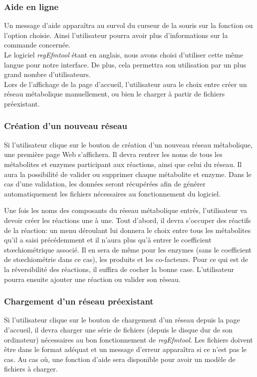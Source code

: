 \subsubsection{Aide en ligne}
Un message d'aide apparaîtra au survol du curseur de la souris sur la fonction ou l'option choisie. Ainsi l'utilisateur pourra avoir plus d'informations sur la commande concernée.\\

Le logiciel \textit{regEfmtool} étant en anglais, nous avons choisi d'utiliser cette même langue pour notre interface. De plus, cela permettra son utilisation par un plus grand nombre d'utilisateurs. \\
Lors de l'affichage de la page d'accueil, l'utilisateur aura le choix entre créer un réseau métabolique manuellement, ou bien le charger à partir de fichiers préexistant. 
			
\subsubsection{Création d'un nouveau réseau}

Si l'utilisateur clique sur le bouton de création d'un nouveau réseau métabolique, une première page Web s'affichera. Il devra rentrer les noms de tous les métabolites et enzymes participant aux réactions, ainsi que celui du réseau. Il aura la possibilité de valider ou supprimer chaque métabolite et enzyme. Dans le cas d'une validation, les données seront récupérées afin de générer automatiquement les fichiers nécessaires au fonctionnement du logiciel.

Une fois les noms des composants du réseau métabolique entrés, l'utilisateur va devoir créer les réactions une à une. Tout d'abord, il devra s'occuper des réactifs de la réaction: un menu déroulant lui donnera le choix entre tous les métabolites qu'il a saisi précédemment et il n'aura plus qu'à entrer le coefficient stœchiométrique associé. Il en sera de même pour les enzymes (sans le coefficient de stœchiométrie dans ce cas), les produits et les co-facteurs. Pour ce qui est de la réversibilité des réactions, il suffira de cocher la bonne case. L'utilisateur pourra ensuite ajouter une réaction ou valider son réseau. 

\subsubsection{Chargement d'un réseau préexistant}

Si l'utilisateur clique sur le bouton de chargement d'un réseau depuis la page d'accueil, il devra charger une série de fichiers (depuis le disque dur de son ordinateur) nécessaires au bon fonctionnement de \textit{regEfmtool}. Les fichiers doivent être dans le format adéquat et un message d'erreur appara\^itra si ce n'est pas le cas. Au cas où, une fonction d'aide sera disponible pour avoir un modèle de fichiers à charger. 

